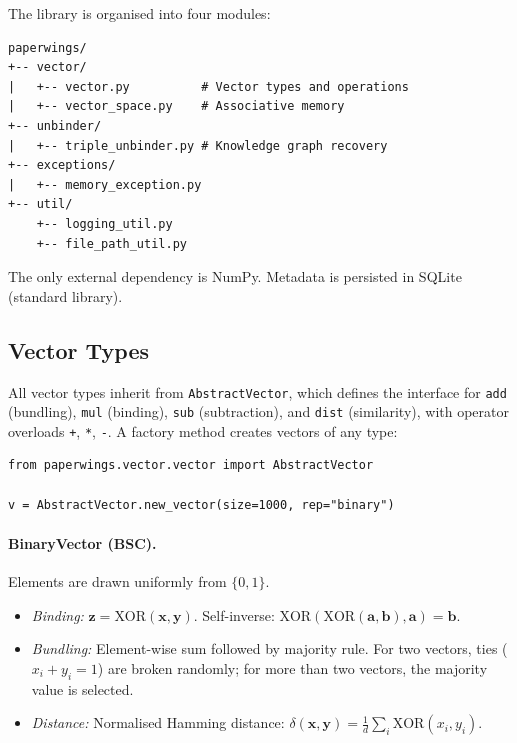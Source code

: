 \documentclass[11pt]{article}
\begin{document}
The library is organised into four modules:

\begin{verbatim}
paperwings/
+-- vector/
|   +-- vector.py          # Vector types and operations
|   +-- vector_space.py    # Associative memory
+-- unbinder/
|   +-- triple_unbinder.py # Knowledge graph recovery
+-- exceptions/
|   +-- memory_exception.py
+-- util/
    +-- logging_util.py
    +-- file_path_util.py
\end{verbatim}

\noindent The only external dependency is NumPy. Metadata is persisted in SQLite (standard library).

\subsection{Vector Types}

All vector types inherit from \texttt{AbstractVector}, which defines the interface for \texttt{add} (bundling), \texttt{mul} (binding), \texttt{sub} (subtraction), and \texttt{dist} (similarity), with operator overloads \texttt{+}, \texttt{*}, \texttt{-}. A factory method creates vectors of any type:

\begin{lstlisting}
from paperwings.vector.vector import AbstractVector

v = AbstractVector.new_vector(size=1000, rep="binary")
\end{lstlisting}

\paragraph{BinaryVector (BSC).} Elements are drawn uniformly from $\{0, 1\}$.
\begin{itemize}
    \item \textit{Binding:} $\mathbf{z} = \text{XOR}(\mathbf{x}, \mathbf{y})$. Self-inverse: $\text{XOR}(\text{XOR}(\mathbf{a}, \mathbf{b}), \mathbf{a}) = \mathbf{b}$.
    \item \textit{Bundling:} Element-wise sum followed by majority rule. For two vectors, ties ($x_i + y_i = 1$) are broken randomly; for more than two vectors, the majority value is selected.
    \item \textit{Distance:} Normalised Hamming distance: $\delta(\mathbf{x}, \mathbf{y}) = \frac{1}{d}\sum_i \text{XOR}(x_i, y_i)$.
\end{itemize}
\end{document}
